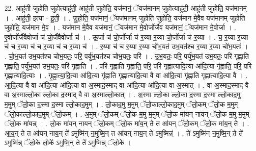 \documentclass[17pt]{extarticle}
\begin{document}
22. आहु॑ती जुहोति जुहो॒त्याहु॑ती॒ आहु॑ती जुहोति॒ यज॑मानं॒ ॅयज॑मानम् जुहो॒त्याहु॑ती॒ आहु॑ती जुहोति॒ यज॑मानम् । . आहु॑ती॒ इत्या - हु॒ती॒ । . जु॒हो॒ति॒ यज॑मानं॒ ॅयज॑मानम् जुहोति जुहोति॒ यज॑मान मे॒वैव यज॑मानम् जुहोति जुहोति॒ यज॑मान मे॒व । . यज॑मान मे॒वैव यज॑मानं॒ ॅयज॑मान मे॒वोर्जोर्जैव यज॑मानं॒ ॅयज॑मान मे॒वोर्जा । . ए॒वोर्जोर्जैवैवोर्जा च॑ चो॒र्जैवैवोर्जा च॑ । . ऊ॒र्जा च॑ चो॒र्जोर्जा च॑ र॒य्या र॒य्या चो॒र्जोर्जा च॑ र॒य्या । . च॒ र॒य्या र॒य्या च॑ च र॒य्या च॑ च र॒य्या च॑ च र॒य्या च॑ । . र॒य्या च॑ च र॒य्या र॒य्या चो॑भ॒यत॑ उभ॒यत॑श्च र॒य्या र॒य्या चो॑भ॒यतः॑ । . चो॒भ॒यत॑ उभ॒यत॑श्च चोभ॒यतः॒ परि॒ पर्यु॑भ॒यत॑श्च चोभ॒यतः॒ परि॑ । . उ॒भ॒यतः॒ परि॒ पर्यु॑भ॒यत॑ उभ॒यतः॒ परि॑ गृह्णाति गृह्णाति॒ पर्यु॑भ॒यत॑ उभ॒यतः॒ परि॑ गृह्णाति । . परि॑ गृह्णाति गृह्णाति॒ परि॒ परि॑ गृह्णात्यादि॒त्या आ॑दि॒त्या गृ॑ह्णाति॒ परि॒ परि॑ गृह्णात्यादि॒त्याः । . गृ॒ह्णा॒त्या॒दि॒त्या आ॑दि॒त्या गृ॑ह्णाति गृह्णात्यादि॒त्या वै वा आ॑दि॒त्या गृ॑ह्णाति गृह्णात्यादि॒त्या वै । . आ॒दि॒त्या वै वा आ॑दि॒त्या आ॑दि॒त्या वा अ॒स्माद॒स्माद् वा आ॑दि॒त्या आ॑दि॒त्या वा अ॒स्मात् । . वा अ॒स्माद॒स्माद् वै वा अ॒स्माल्लो॒का ल्लो॒का द॒स्माद् वै वा अ॒स्माल्लो॒कात् । . अ॒स्मा ल्लो॒का ल्लो॒का द॒स्मा द॒स्मा ल्लो॒काद॒मु म॒मुम् ॅलो॒का द॒स्मा द॒स्मा ल्लो॒काद॒मुम् । . लो॒काद॒मु म॒मुम् ॅलो॒काल्लो॒काद॒मुम् ॅलो॒कम् ॅलो॒क म॒मुम् ॅलो॒काल्लो॒काद॒मुम् ॅलो॒कम् । . अ॒मुम् ॅलो॒कम् ॅलो॒क म॒मु म॒मुम् ॅलो॒क मा॑यन् नायन् ॅलो॒क म॒मु म॒मुम् ॅलो॒क मा॑यन्न् । . लो॒क मा॑यन् नायन् ॅलो॒कम् ॅलो॒क मा॑य॒न् ते त आ॑यन् ॅलो॒कम् ॅलो॒क मा॑य॒न् ते । . आ॒य॒न् ते त आ॑यन् नाय॒न् ते॑ ऽमुष्मि॑न् न॒मुष्मि॒न् त आ॑यन् नाय॒न् ते॑ ऽमुष्मिन्न्॑ । . ते॑ ऽमुष्मि॑न् न॒मुष्मि॒न् ते ते॑ ऽमुष्मि॑न्न् ॅलो॒के लो॒के॑ ऽमुष्मि॒न् ते ते॑ ऽमुष्मि॑न्न् ॅलो॒के । \newline
\end{document}
